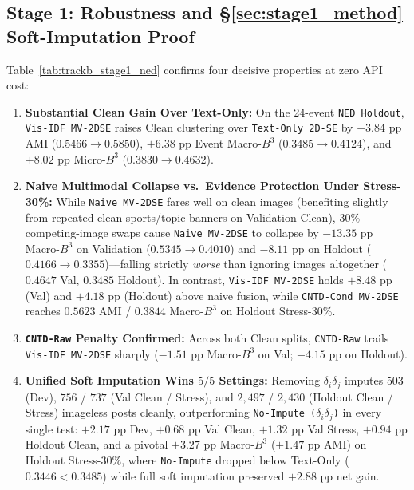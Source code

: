 \subsection{Stage 1: Robustness and §\ref{sec:stage1_method} Soft-Imputation Proof}
\label{sec:exp_stage1}

Table~\ref{tab:trackb_stage1_ned} confirms four decisive properties at zero API cost:
\begin{enumerate}
    \item \textbf{Substantial Clean Gain Over Text-Only:} On the 24-event \texttt{NED Holdout}, \texttt{Vis-IDF MV-2DSE} raises Clean clustering over \texttt{Text-Only 2D-SE} by $+3.84\text{ pp}$ AMI ($0.5466 \to 0.5850$), $+6.38\text{ pp}$ Event Macro-$B^3$ ($0.3485 \to 0.4124$), and $+8.02\text{ pp}$ Micro-$B^3$ ($0.3830 \to 0.4632$).
    \item \textbf{Naive Multimodal Collapse vs.\ Evidence Protection Under Stress-30\%:} While \texttt{Naive MV-2DSE} fares well on clean images (benefiting slightly from repeated clean sports/topic banners on Validation Clean), $30\%$ competing-image swaps cause \texttt{Naive MV-2DSE} to collapse by $-13.35\text{ pp}$ Macro-$B^3$ on Validation ($0.5345 \to 0.4010$) and $-8.11\text{ pp}$ on Holdout ($0.4166 \to 0.3355$)---falling strictly \emph{worse} than ignoring images altogether ($0.4647$ Val, $0.3485$ Holdout). In contrast, \texttt{Vis-IDF MV-2DSE} holds $+8.48\text{ pp}$ (Val) and $+4.18\text{ pp}$ (Holdout) above naive fusion, while \texttt{CNTD-Cond MV-2DSE} reaches $0.5623$ AMI / $0.3844$ Macro-$B^3$ on Holdout Stress-30\%.
    \item \textbf{\texttt{CNTD-Raw} Penalty Confirmed:} Across both Clean splits, \texttt{CNTD-Raw} trails \texttt{Vis-IDF MV-2DSE} sharply ($-1.51\text{ pp}$ Macro-$B^3$ on Val; $-4.15\text{ pp}$ on Holdout).
    \item \textbf{Unified Soft Imputation Wins $5/5$ Settings:} Removing $\delta_i \delta_j$ imputes $503$ (Dev), $756$ / $737$ (Val Clean / Stress), and $2{,}497$ / $2{,}430$ (Holdout Clean / Stress) imageless posts cleanly, outperforming \texttt{No-Impute ($\delta_i\delta_j$)} in every single test: $+2.17\text{ pp}$ Dev, $+0.68\text{ pp}$ Val Clean, $+1.32\text{ pp}$ Val Stress, $+0.94\text{ pp}$ Holdout Clean, and a pivotal $+3.27\text{ pp}$ Macro-$B^3$ ($+1.47\text{ pp}$ AMI) on Holdout Stress-30\%, where \texttt{No-Impute} dropped below Text-Only ($0.3446 < 0.3485$) while full soft imputation preserved $+2.88\text{ pp}$ net gain.
\end{enumerate}

